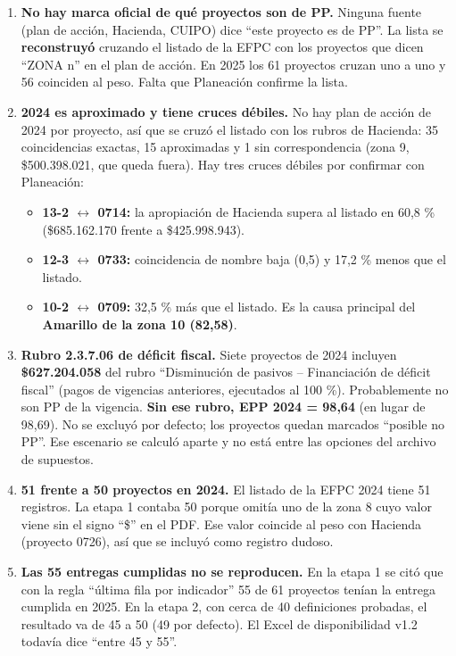 \documentclass[11pt,letterpaper]{article}
\begin{document}
\begin{enumerate}
\item \textbf{No hay marca oficial de qué proyectos son de PP.} Ninguna fuente (plan de acción, Hacienda, CUIPO) dice ``este proyecto es de PP''. La lista se \textbf{reconstruyó} cruzando el listado de la EFPC con los proyectos que dicen ``ZONA n'' en el plan de acción. En 2025 los 61 proyectos cruzan uno a uno y 56 coinciden al peso. Falta que Planeación confirme la lista.
\item \textbf{2024 es aproximado y tiene cruces débiles.} No hay plan de acción de 2024 por proyecto, así que se cruzó el listado con los rubros de Hacienda: 35 coincidencias exactas, 15 aproximadas y 1 sin correspondencia (zona 9, \$500.398.021, que queda fuera). Hay tres cruces débiles por confirmar con Planeación:
\begin{itemize}
\item \textbf{13-2 $\leftrightarrow$ 0714:} la apropiación de Hacienda supera al listado en 60,8 \% (\$685.162.170 frente a \$425.998.943).
\item \textbf{12-3 $\leftrightarrow$ 0733:} coincidencia de nombre baja (0,5) y 17,2 \% menos que el listado.
\item \textbf{10-2 $\leftrightarrow$ 0709:} 32,5 \% más que el listado. Es la causa principal del \textbf{Amarillo de la zona 10 (82,58)}.
\end{itemize}
\item \textbf{Rubro 2.3.7.06 de déficit fiscal.} Siete proyectos de 2024 incluyen \textbf{\$627.204.058} del rubro ``Disminución de pasivos -- Financiación de déficit fiscal'' (pagos de vigencias anteriores, ejecutados al 100 \%). Probablemente no son PP de la vigencia. \textbf{Sin ese rubro, EPP 2024 = 98,64} (en lugar de 98,69). No se excluyó por defecto; los proyectos quedan marcados ``posible no PP''. Ese escenario se calculó aparte y no está entre las opciones del archivo de supuestos.
\item \textbf{51 frente a 50 proyectos en 2024.} El listado de la EFPC 2024 tiene 51 registros. La etapa 1 contaba 50 porque omitía uno de la zona 8 cuyo valor viene sin el signo ``\$'' en el PDF. Ese valor coincide al peso con Hacienda (proyecto 0726), así que se incluyó como registro dudoso.
\item \textbf{Las 55 entregas cumplidas no se reproducen.} En la etapa 1 se citó que con la regla ``última fila por indicador'' 55 de 61 proyectos tenían la entrega cumplida en 2025. En la etapa 2, con cerca de 40 definiciones probadas, el resultado va de 45 a 50 (49 por defecto). El Excel de disponibilidad v1.2 todavía dice ``entre 45 y 55''.

\end{enumerate}
\end{document}
